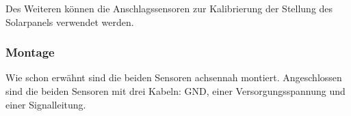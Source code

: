 Des Weiteren können die Anschlagssensoren zur Kalibrierung der Stellung des Solarpanels verwendet werden.

\subsubsection{Montage}

Wie schon erwähnt sind die beiden Sensoren achsennah montiert. Angeschlossen sind die beiden Sensoren mit drei Kabeln: GND, einer Versorgungsspannung und einer Signalleitung.
